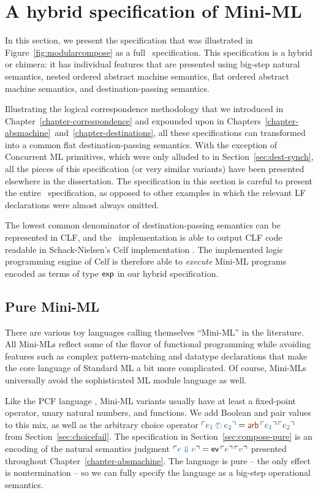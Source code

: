 \chapter{A hybrid specification of Mini-ML}
\label{appendix-hybrid}

In this section, we present the specification that was illustrated in
Figure~\ref{fig:modularcompose} as a full \sls~specification. This
specification is a hybrid or chimera: it has individual features that
are presented using big-step natural semantics, nested ordered abstract
machine semantics, flat ordered abstract machine semantics, and
destination-passing semantics.

Illustrating the logical correspondence methodology that we introduced
in Chapter~\ref{chapter-correspondence} and expounded upon in
Chapters~\ref{chapter-absmachine}~and~\ref{chapter-destinations}, all
these specifications can transformed into a common flat
destination-passing semantics. With the exception of Concurrent ML
primitives, which were only alluded to in
Section~\ref{sec:dest-synch}, all the pieces of this specification (or
very similar variants) have been presented elsewhere in the
dissertation. The specification in this section is careful to present
the entire \sls~specification, as opposed to other examples in which
the relevant LF declarations were almost always omitted.

The lowest common denominator of destination-passing semantics can be
represented in CLF, and the \sls~implementation is able to output CLF
code readable in Schack-Nielsen's Celf implementation
\cite{schacknielsen08celf}. The implemented logic programming engine
of Celf is therefore able to {\it execute} Mini-ML programs encoded as
terms of type ${\sf exp}$ in our hybrid specification.

\section{Pure Mini-ML}

There are various toy languages calling themselves ``Mini-ML'' in the
literature. All Mini-MLs reflect some of the flavor of functional
programming while avoiding features such as complex pattern-matching
and datatype declarations that make the core language of Standard ML
\cite{milner97definition} a bit more complicated.  Of course, Mini-MLs
universally avoid the sophisticated ML module language as well.

Like the PCF language \cite{plotkin77lcf}, Mini-ML variants usually
have at least a fixed-point operator, unary natural numbers, and
functions. We add Boolean and pair values to this mix, as well as the
arbitrary choice operator $\interp{e_1 \arb e_2} = \lf{{\sf
  arb}\,\interp{e_1}\,\interp{e_2}}$ from
Section~\ref{sec:choicefail}. The specification in
Section~\ref{sec:compose-pure} is an encoding of the natural semantics
judgment $\interp{e \Downarrow v} = {\sf ev}\,\interp{e}\,\interp{v}$
presented throughout Chapter~\ref{chapter-absmachine}. The language is
pure -- the only effect is nontermination -- so we can fully specify
the language as a big-step operational semantics.

